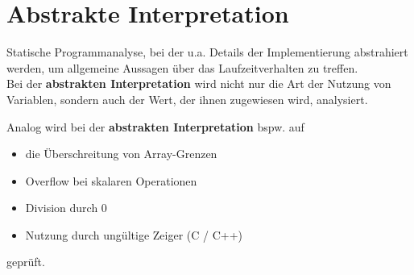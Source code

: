 \section{Abstrakte Interpretation}

\begin{tcolorbox}[title=Abstrakte Interpretation]
    Statische Programmanalyse, bei der u.a. Details der Implementierung abstrahiert werden, um allgemeine Aussagen über das Laufzeitverhalten zu treffen.\\

    \noindent
    Bei der \textbf{abstrakten Interpretation} wird nicht nur die Art der Nutzung von Variablen, sondern auch der Wert, der ihnen zugewiesen wird, analysiert.


    \noindent
    Analog wird bei der \textbf{abstrakten Interpretation} bspw. auf
    \begin{itemize}
        \item die Überschreitung von Array-Grenzen
        \item Overflow bei skalaren Operationen
        \item Division durch 0
        \item Nutzung durch ungültige Zeiger (C / C++)
    \end{itemize}
    \noindent
    geprüft.
\end{tcolorbox}

